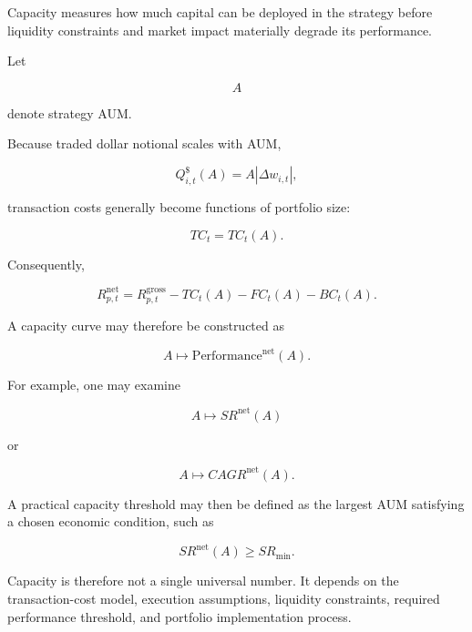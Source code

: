 \documentclass[11pt,a4paper]{article}
\begin{document}
Capacity measures how much capital can be deployed in the strategy before
liquidity constraints and market impact materially degrade its performance.

Let

\begin{equation}
A
\end{equation}

denote strategy AUM.

Because traded dollar notional scales with AUM,

\begin{equation}
Q_{i,t}^{\$}(A)
=
A
|\Delta w_{i,t}|,
\end{equation}

transaction costs generally become functions of portfolio size:

\begin{equation}
TC_t
=
TC_t(A).
\end{equation}

Consequently,

\begin{equation}
\boxed{
R_{p,t}^{\mathrm{net}}
=
R_{p,t}^{\mathrm{gross}}
-
TC_t(A)
-
FC_t(A)
-
BC_t(A).
}
\end{equation}

A capacity curve may therefore be constructed as

\begin{equation}
\boxed{
A
\longmapsto
\mathrm{Performance}^{\mathrm{net}}(A).
}
\end{equation}

For example, one may examine

\begin{equation}
A
\longmapsto
SR^{\mathrm{net}}(A)
\end{equation}

or

\begin{equation}
A
\longmapsto
CAGR^{\mathrm{net}}(A).
\end{equation}

A practical capacity threshold may then be defined as the largest AUM satisfying
a chosen economic condition, such as

\begin{equation}
SR^{\mathrm{net}}(A)
\geq
SR_{\min}.
\end{equation}

Capacity is therefore not a single universal number. It depends on the
transaction-cost model, execution assumptions, liquidity constraints, required
performance threshold, and portfolio implementation process.
\end{document}

